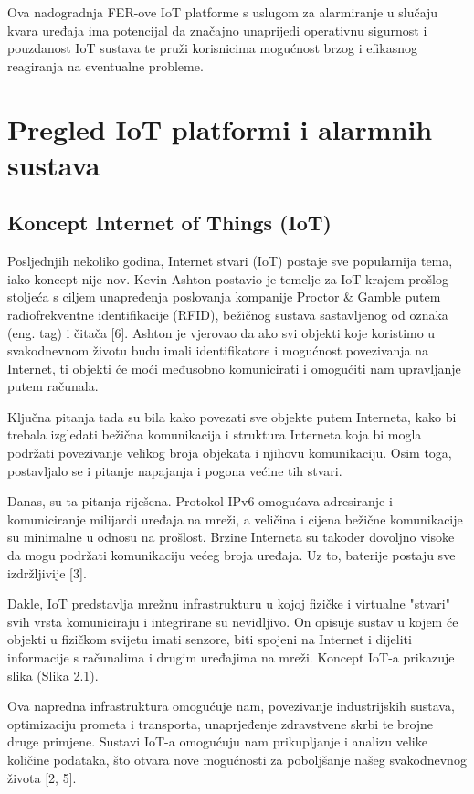 \documentclass[times, utf8, zavrsni]{fer}
\begin{document}
Ova nadogradnja FER-ove IoT platforme s uslugom za alarmiranje u slučaju kvara uređaja ima potencijal da značajno unaprijedi operativnu sigurnost i pouzdanost IoT sustava te pruži korisnicima mogućnost brzog i efikasnog reagiranja na eventualne probleme.

\chapter{Pregled IoT platformi i alarmnih sustava}
\section{Koncept Internet of Things (IoT) }


Posljednjih nekoliko godina, Internet stvari (IoT) postaje sve popularnija tema, iako koncept nije nov. Kevin Ashton postavio je temelje za IoT krajem prošlog stoljeća s ciljem unapređenja poslovanja kompanije Proctor \& Gamble putem radiofrekventne identifikacije (RFID), bežičnog sustava sastavljenog od oznaka (eng. tag) i čitača [6]. Ashton je vjerovao da ako svi objekti koje koristimo u svakodnevnom životu budu imali identifikatore i mogućnost povezivanja na Internet, ti objekti će moći međusobno komunicirati i omogućiti nam upravljanje putem računala.

Ključna pitanja tada su bila kako povezati sve objekte putem Interneta, kako bi trebala izgledati bežična komunikacija i struktura Interneta koja bi mogla podržati povezivanje velikog broja objekata i njihovu komunikaciju. Osim toga, postavljalo se i pitanje napajanja i pogona većine tih stvari.

 Danas, su ta pitanja riješena. Protokol IPv6 omogućava adresiranje i komuniciranje milijardi uređaja na mreži, a veličina i cijena bežične komunikacije su minimalne u odnosu na prošlost. Brzine Interneta su također dovoljno visoke da mogu podržati komunikaciju većeg broja uređaja. Uz to, baterije postaju sve izdržljivije [3].

 Dakle, IoT predstavlja mrežnu infrastrukturu u kojoj fizičke i virtualne "stvari" svih vrsta komuniciraju i integrirane su nevidljivo. On opisuje sustav u kojem će objekti u fizičkom svijetu imati senzore, biti spojeni na Internet i dijeliti informacije s računalima i drugim uređajima na mreži. Koncept IoT-a prikazuje slika (Slika 2.1).

 Ova napredna infrastruktura omogućuje nam, povezivanje industrijskih sustava, optimizaciju prometa i transporta, unaprjeđenje zdravstvene skrbi te brojne druge primjene. Sustavi IoT-a omogućuju nam prikupljanje i analizu velike količine podataka, što otvara nove mogućnosti za poboljšanje našeg svakodnevnog života [2, 5].
 
\end{document}
